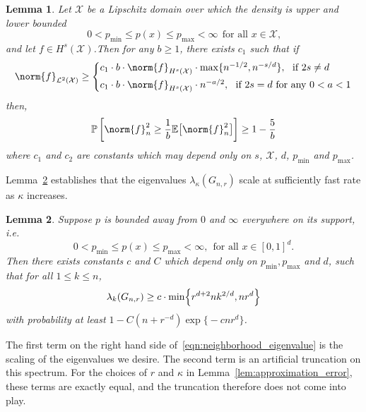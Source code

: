 \documentclass{article}
\newcommand{\1}{\mathbf{1}}
\newcommand{\Xset}{\mathcal{X}}
\newcommand{\Leb}{\mathcal{L}}
\newcommand{\Ebb}{\mathbb{E}}
\theoremstyle{alden}
\theoremstyle{aldenthm}
\newtheorem{lemma}{Lemma}
\theoremstyle{definition}
\theoremstyle{remark}
\begin{document}
\begin{lemma}
	\label{lem:empirical_norm_sobolev}
	Let $\Xset$ be a Lipschitz domain over which the density is upper and lower bounded 
	\begin{equation*}
	0 < p_{\min} \leq p(x) \leq p_{\max} < \infty ~~\textrm{for all $x \in \Xset$,}
	\end{equation*}
	and let $f \in H^s(\Xset)$.Then for any $b \geq 1$, there exists $c_1$ such that if 
	\begin{equation}
	\norm{f}_{\Leb^2(\Xset)} \geq 
	\begin{cases*}
	c_1 \cdot b \cdot \norm{f}_{H^s(\Xset)} \cdot \max\{n^{-1/2},n^{-s/d}\},~~\textrm{if}~2s \neq d \\
	c_1 \cdot b \cdot \norm{f}_{H^s(\Xset)} \cdot n^{-a/2},~~\textrm{if}~ 2s = d ~\textrm{for any}~ 0 < a < 1
	\end{cases*}
	\end{equation}
	then,
	\begin{equation}
	\label{eqn:l2_to_empirical_norm_sobolev}
	\mathbb{P}\left[\norm{f}_n^2 \geq \frac{1}{b} \Ebb\bigl[\norm{f}_n^2\bigr]\right] \geq 1 - \frac{5}{b}
	\end{equation}
	where $c_1$ and $c_2$ are constants which may depend only on $s$, $\Xset$, $d$, $p_{\min}$ and $p_{\max}$.
\end{lemma}

Lemma~\ref{lem:neighborhood_eigenvalue} establishes that the eigenvalues $\lambda_{\kappa}(G_{n,r})$ scale at sufficiently fast rate as $\kappa$ increases.
\begin{lemma}
	\label{lem:neighborhood_eigenvalue}
	Suppose $p$ is bounded away from $0$ and $\infty$ everywhere on its support, i.e.
	\begin{equation*}
	0 < p_{\min} \leq p(x) \leq p_{\max} < \infty,~~ \textrm{for all $x \in [0,1]^d$.}
	\end{equation*}
	Then there exists constants $c$ and $C$ which depend only on $p_{\min}, p_{\max}$ and $d$, such that for all $1 \leq k \leq n$,
	\begin{equation}
	\label{eqn:neighborhood_eigenvalue}
	\lambda_k(G_{n,r}) \geq c \cdot \min\Bigl\{r^{d + 2}nk^{2/d}, nr^d\Bigr\} 
	\end{equation}
	with probability at least $1 - C (n + r^{-d}) \exp\bigl\{- c n r^d\bigr\}$. 
\end{lemma}

The first term on the right hand side of~\eqref{eqn:neighborhood_eigenvalue} is the scaling of the eigenvalues we desire. The second term is an artificial truncation on this spectrum. For the choices of $r$ and $\kappa$ in Lemma~\ref{lem:approximation_error}, these terms are exactly equal, and the truncation therefore does not come into play.
\end{document}
